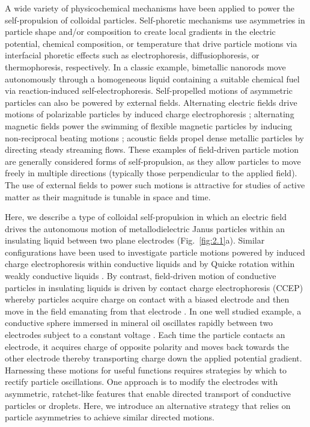 A wide variety of physicochemical mechanisms have been applied to power the self-propulsion of colloidal particles.
Self-phoretic mechanisms\cite{golestanian2007designing} use asymmetries in particle shape and/or composition to create local gradients in the electric potential\cite{Brown2014}, chemical composition\cite{Howse2007}, or temperature\cite{Jiang2010} that drive particle motions via interfacial phoretic effects such as electrophoresis, diffusiophoresis, or thermophoresis, respectively\cite{Anderson1989}.
In a classic example\cite{Paxton2004,Fournier-Bidoz2005}, bimetallic nanorods move autonomously through a homogeneous liquid containing a suitable chemical fuel via reaction-induced  self-electrophoresis\cite{Wang2006,Moran2010}. 
Self-propelled motions of asymmetric particles can also be powered by external fields.
Alternating electric fields drive motions of polarizable particles by induced charge electrophoresis \cite{Squires2006,Gangwal2008,Boymelgreen2014}; alternating magnetic fields power the swimming of flexible magnetic particles by inducing non-reciprocal beating motions \cite{Dreyfus2005}; acoustic fields propel dense metallic particles by directing steady streaming flows\cite{Wang2012,Nadal2014,Ahmed2015}. 
These examples of field-driven particle motion are generally considered forms of self-propulsion, as they allow particles to move freely in multiple directions (typically those perpendicular to the applied field).
The use of external fields to power such motions is attractive for studies of active matter as their magnitude is tunable in space and time.

Here, we describe a type of colloidal self-propulsion in which an electric field drives the autonomous motion of metallodielectric Janus particles\cite{Perro2005,Pawar2008} within an insulating liquid between two plane electrodes (Fig.~\ref{fig:2.1}a).
Similar configurations have been used to investigate particle motions powered by induced charge electrophoresis within conductive liquids\cite{Boymelgreen2014} and by Quicke rotation within weakly conductive liquids \cite{Bricard2013}.
By contrast, field-driven  motion of conductive particles in insulating liquids is driven by contact charge electrophoresis (CCEP) whereby particles acquire charge on contact with a biased electrode and then move in the field emanating from that electrode \cite{drews2013ratcheted,cartier2014microfluidic,drews2015contact}.
In one well studied example, a conductive sphere immersed in mineral oil oscillates rapidly between two electrodes subject to a constant voltage \cite{drews2015contact}.
Each time the particle contacts an electrode, it acquires charge of opposite polarity and moves back towards the other electrode thereby transporting charge down the applied potential gradient.
Harnessing these motions for useful functions requires strategies by which to rectify particle oscillations.
One approach is to modify the electrodes with asymmetric, ratchet-like features that enable directed transport of conductive particles\cite{drews2013ratcheted} or droplets\cite{Um2016}.
Here, we introduce an alternative strategy that relies on particle asymmetries to achieve similar directed motions.


